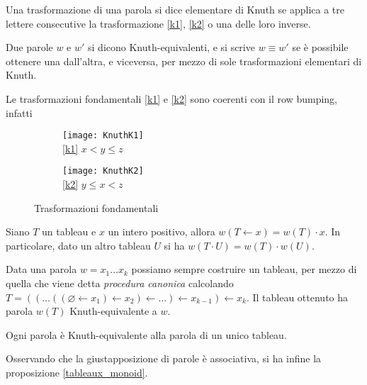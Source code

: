 \begin{defn}
Una trasformazione di una parola si dice elementare di Knuth se
applica a tre lettere consecutive la trasformazione \eqref{k1},
\eqref{k2} o una delle loro inverse.
\end{defn}

\begin{defn}
Due parole $w$ e $w'$ si dicono Knuth-equivalenti, e si scrive $w
\equiv w'$ se \`e possibile ottenere una dall'altra, e viceversa, per
mezzo di sole trasformazioni elementari di Knuth.
\end{defn}
\begin{oss}
Le trasformazioni fondamentali \eqref{k1} e \eqref{k2} sono coerenti
con il row bumping, infatti

\begin{figure}[h]
\centering

\begin{subfigure}[b]{0.3\textwidth}
\centering
\texttt{[image: KnuthK1]}\\
\eqref{k1} $x < y \leq z$
\end{subfigure}%
\begin{subfigure}[b]{0.3\textwidth}
\centering
\texttt{[image: KnuthK2]}\\
\eqref{k2} $y \leq x < z$
\end{subfigure}

\caption{Trasformazioni fondamentali}
\end{figure}
\end{oss}

\begin{prop}\label{word_bump_equiv}
Siano $T$ un tableau e $x$ un intero positivo, allora $w(T \gets x) = w(T)
\cdot x$. In particolare, dato un altro tableau $U$ si ha $w(T\cdot U)
= w(T) \cdot w(U)$.
\end{prop}

Data una parola $w = x_1 \ldots x_k$ possiamo sempre costruire un
tableau, per mezzo di quella che viene detta \emph{procedura canonica}
calcolando $T = (( \ldots ((\varnothing \gets x_1) \gets x_2 ) \gets \ldots ) \gets x_{k-1} )
\gets x_k$. Il tableau ottenuto ha parola $w(T)$ Knuth-equivalente a
$w$.

\begin{teo}\label{knuth_equiv_word}
Ogni parola \`e Knuth-equivalente alla parola di un unico tableau.
\end{teo}

Osservando che la giustapposizione di parole \`e associativa, si ha
infine la proposizione \eqref{tableaux_monoid}.
